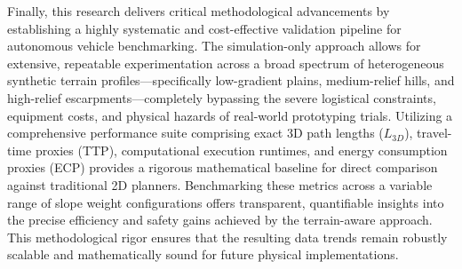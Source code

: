 Finally, this research delivers critical methodological advancements by
establishing a highly systematic and cost-effective validation pipeline for
autonomous vehicle benchmarking. The simulation-only approach allows for
extensive, repeatable experimentation across a broad spectrum of heterogeneous
synthetic terrain profiles---specifically low-gradient plains, medium-relief
hills, and high-relief escarpments---completely bypassing the severe logistical
constraints, equipment costs, and physical hazards of real-world prototyping
trials. Utilizing a comprehensive performance suite comprising exact 3D path
lengths ($L_{3D}$), travel-time proxies (TTP), computational execution runtimes,
and energy consumption proxies (ECP) provides a rigorous mathematical baseline
for direct comparison against traditional 2D planners. Benchmarking these
metrics across a variable range of slope weight configurations offers
transparent, quantifiable insights into the precise efficiency and safety gains
achieved by the terrain-aware approach. This methodological rigor ensures that
the resulting data trends remain robustly scalable and mathematically sound for
future physical implementations.
